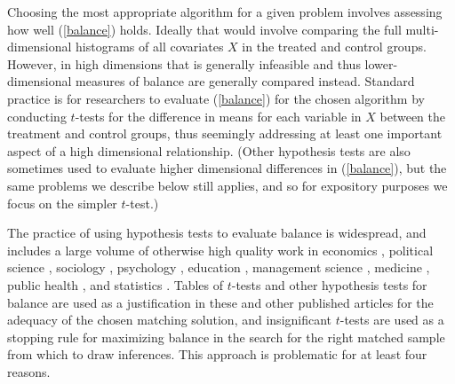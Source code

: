 \documentclass[11pt,titlepage]{article}
\begin{document}
Choosing the most appropriate algorithm for a given problem involves assessing how well
(\ref{balance}) holds.  Ideally that would involve comparing the full multi-dimensional histograms of all
covariates $X$ in the treated and control groups.  However, in high dimensions that is generally
infeasible and thus lower-dimensional measures of balance are generally compared instead.
Standard practice is for researchers to evaluate (\ref{balance}) for
the chosen algorithm by conducting $t$-tests for the difference in
means for each variable in $X$ between the treatment and control
groups, thus seemingly addressing at least one important aspect of a
high dimensional relationship.  (Other hypothesis tests are also
sometimes used to evaluate higher dimensional differences in
(\ref{balance}), but the same problems we describe below still
applies, and so for expository purposes we focus on the simpler
$t$-test.)

The practice of 
using hypothesis tests to evaluate balance is
widespread, and includes a large volume of otherwise high quality work
in economics \citep{LisMilFre03,BlaSmi04,AgoDyn04,DehWah99,
  DehWah02,SmiTod05}, political science \citep{Imai05,SimHop05},
sociology \citep{LunSmi05}, psychology
\citep{HavNag05,HilWalBro05,YosMagBos03,JonDAgGon04,McCRidMor04},
education \citep{Crosnoe05,SchBuc03}, management science
\citep{FreMil04, Villalonga04,WanSchAvo05}, medicine
\citep{WanSchAvo05, MacRivJur06,LinPekWan05,ManTudDie06, PetRoeMul06,
  ShiLitPot06,SabCanGib05,PerTuUnd00,AusMam06,AusMamStu05}, public
health \citep{NovReaRau06,ElBGilWu05,LauSmiSta00,BinBreEar05}, and
statistics \citep{LuZanHor01}.  Tables of $t$-tests and other
hypothesis tests for balance are used as a justification in these and
other published articles for the adequacy of the chosen matching
solution, and insignificant $t$-tests are used as a stopping rule
for maximizing balance in the search for the right
matched sample from which to draw inferences.  This approach is problematic
for at least four reasons.
\end{document}
